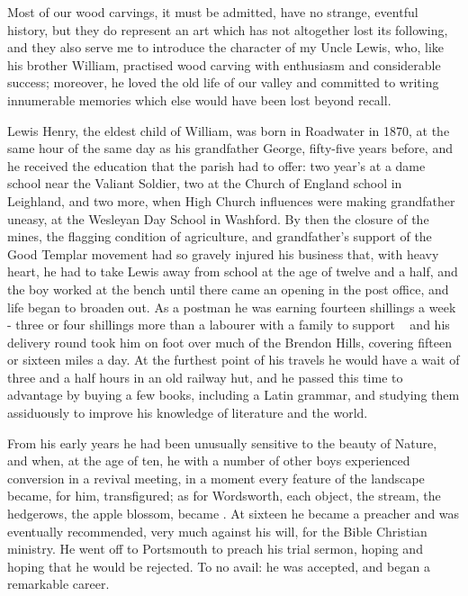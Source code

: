 
Most of our wood carvings, it must be admitted, have no strange, eventful history, but they do represent an art which has not altogether lost its following, and they also serve me to introduce the character of my Uncle Lewis, who, like his brother William, practised wood carving with enthusiasm and considerable success; moreover, he loved the old life of our valley and committed to writing innumerable memories which else would have been lost beyond recall.

Lewis Henry, the eldest child of William, was born in Roadwater in 1870, at the same hour of the same day as his grandfather George, fifty-five years before, and he received the education that the parish had to offer: two year's at a dame school near the Valiant Soldier, two at the Church of England school in Leighland, and two more, when High Church influences were making grandfather uneasy, at the Wesleyan Day School in Washford. By then the closure of the mines, the flagging condition of agriculture, and grandfather's support of the Good Templar movement had so gravely injured his business that, with heavy heart, he had to take Lewis away from school at the age of twelve and a half, and the boy worked at the bench until there came an opening in the post office, and life began to broaden out. As a postman he was earning fourteen shillings a week - three or four shillings more than a labourer with a family to support ~ and his delivery round took him on foot over much of the Brendon Hills, covering fifteen or sixteen miles a day. At the furthest point of his travels he would have a wait of three and a half hours in an old railway hut, and he passed this time to advantage by buying a few books, including a Latin grammar, and studying them assiduously to improve his knowledge of literature and the world.

From his early years he had been unusually sensitive to the beauty of Nature, and when, at the age of ten, he with a number of other boys experienced conversion in a revival meeting, in a moment every feature of the landscape became, for him, transfigured; as for Wordsworth, each object, the stream, the hedgerows, the apple blossom, became . At sixteen he became a preacher and was eventually recommended, very much against his will, for the Bible Christian ministry. He went off to Portsmouth to preach his trial sermon, hoping and hoping that he would be rejected. To no avail: he was accepted, and began a remarkable career.

